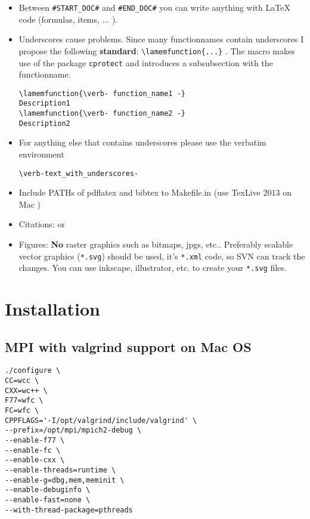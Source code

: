 \documentclass{scrartcl}
\newcommand{\lamemfunction}[1]{\subsubsection{Function: #1}}
\begin{document}
\begin{itemize}
\item Between \verb-#START_DOC#- and \verb-#END_DOC#- you can write anything with LaTeX code (formulas, items, ... ).

\item Underscores cause problems. Since many functionnames contain underscores I propose the following \textbf{standard}: \verb-\lamemfunction{...}- . The macro makes use of the package \texttt{cprotect} and introduces a subsubsection with the functionname.
\begin{verbatim}
\lamemfunction{\verb- function_name1 -}
Description1
\lamemfunction{\verb- function_name2 -}
Description2
\end{verbatim}
\item For anything else that contains underscores please use the verbatim environment 
\begin{verbatim}
\verb-text_with_underscores-
\end{verbatim}
\item Include PATHs of pdflatex and bibtex to Makefile.in (use TexLive 2013 on Mac ) 
\item Citations: \citep{petsc-web-page} or \citet{petsc-user-ref} 
\item Figures: \textbf{No} raster graphics such as bitmaps, jpgs, etc.. Preferably scalable vector graphics (\verb-*.svg-) should be used, it's \verb-*.xml- code, so SVN can track the changes. You can use inkscape, illustrator, etc. to create your \verb-*.svg- files.
\end{itemize}


\section{Installation}

\subsection{MPI with valgrind support on Mac OS}
\begin{Verbatim}[frame=single]
./configure \
CC=wcc \
CXX=wc++ \
F77=wfc \
FC=wfc \
CPPFLAGS='-I/opt/valgrind/include/valgrind' \
--prefix=/opt/mpi/mpich2-debug \
--enable-f77 \
--enable-fc \
--enable-cxx \
--enable-threads=runtime \
--enable-g=dbg,mem,meminit \
--enable-debuginfo \
--enable-fast=none \
--with-thread-package=pthreads
\end{Verbatim}
\end{document}
